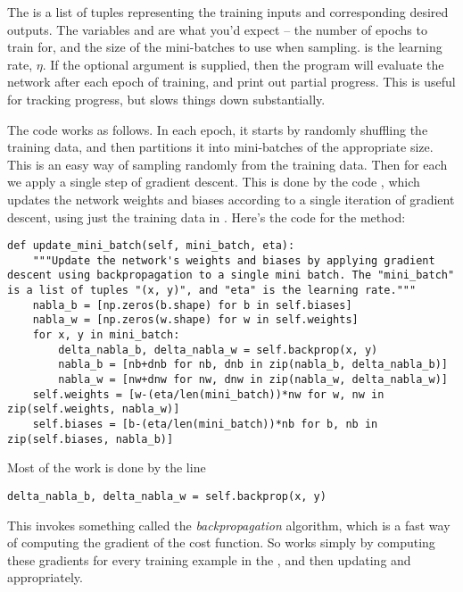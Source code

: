 \documentclass[a4paper,twoside,10pt]{book}
\begin{document}
The  is a list of tuples  representing the training inputs and corresponding desired outputs. The variables  and    are what you'd expect -- the number of epochs to train for, and the size of the mini-batches to use when sampling.  is the learning rate, $\eta$. If the optional argument  is supplied, then the program will evaluate the network after each epoch of training, and print out partial progress. This is useful for tracking progress, but slows things down substantially.

The code works as follows. In each epoch, it starts by randomly shuffling the training data, and then partitions it into mini-batches of the appropriate size. This is an easy way of sampling randomly from the training data. Then for each  we apply a single step of gradient descent. This is done by the code , which updates the network weights and biases according to a single iteration of gradient descent, using just the training data in . Here's the code for the  method:

\begin{lstlisting}
def update_mini_batch(self, mini_batch, eta):
	"""Update the network's weights and biases by applying gradient descent using backpropagation to a single mini batch. The "mini_batch" is a list of tuples "(x, y)", and "eta" is the learning rate."""
	nabla_b = [np.zeros(b.shape) for b in self.biases]
	nabla_w = [np.zeros(w.shape) for w in self.weights]
	for x, y in mini_batch:
		delta_nabla_b, delta_nabla_w = self.backprop(x, y)
		nabla_b = [nb+dnb for nb, dnb in zip(nabla_b, delta_nabla_b)]
		nabla_w = [nw+dnw for nw, dnw in zip(nabla_w, delta_nabla_w)]
	self.weights = [w-(eta/len(mini_batch))*nw for w, nw in zip(self.weights, nabla_w)]
	self.biases = [b-(eta/len(mini_batch))*nb for b, nb in zip(self.biases, nabla_b)]
\end{lstlisting}
Most of the work is done by the line
\begin{lstlisting}
delta_nabla_b, delta_nabla_w = self.backprop(x, y)
\end{lstlisting}
This invokes something called the \textit{backpropagation} algorithm, which is a fast way of computing the gradient of the cost function. So   works simply by computing these gradients for every training example in the , and then updating  and  appropriately.
\end{document}
